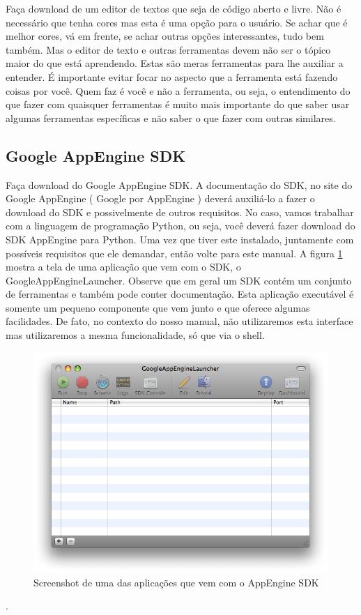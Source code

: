 \documentclass[a4paper]{article}
\begin{document}
Faça download de um editor de textos que seja de código aberto e livre. Não é necessário que tenha cores mas esta é uma opção para o usuário. Se achar que é melhor cores, vá em frente, se achar outras opções interessantes, tudo bem também. Mas o editor de texto e outras ferramentas devem não ser o tópico maior do que está aprendendo. Estas são meras ferramentas para lhe auxiliar a entender. É importante evitar focar no aspecto que a ferramenta está fazendo coisas por você. Quem faz é você e não a ferramenta, ou seja, o entendimento do que fazer com quaisquer ferramentas é muito mais importante do que saber usar algumas ferramentas específicas e não saber o que fazer com outras similares. 

\subsection {Google AppEngine SDK} 

Faça download do Google AppEngine SDK. A documentação do SDK, no site do Google AppEngine ( Google por AppEngine ) deverá auxiliá-lo a fazer o download do SDK e possivelmente de outros requisitos. No caso, vamos trabalhar com a linguagem de programação Python, ou seja, você deverá fazer download do SDK AppEngine para Python. Uma vez que tiver este instalado, juntamente com possíveis requisitos que ele demandar, então volte para este manual. A figura  \ref{fig:appengine-sdk} mostra a tela de uma aplicação que vem com o SDK, o GoogleAppEngineLauncher. Observe que em geral um SDK contém um conjunto de ferramentas e também pode conter documentação. Esta aplicação executável é somente um pequeno componente que vem junto e que oferece algumas facilidades. De fato, no contexto do nosso manual, não utilizaremos esta interface mas utilizaremos a mesma funcionalidade, só que via o shell.


\begin{figure}[!h]
\centering
\includegraphics[width=4.4in]{image-appengine.png}
\caption{Screenshot de uma das aplicações que vem com o AppEngine SDK}
\label{fig:appengine-sdk}
\end{figure}.
\end{document}
